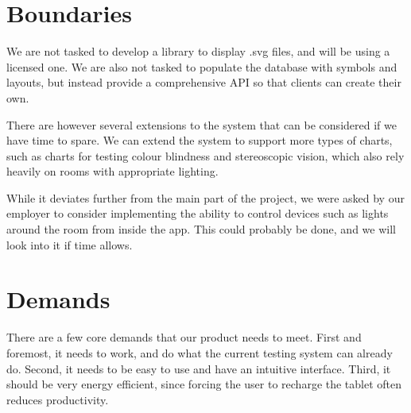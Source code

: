 \documentclass[12pt,a4paper,notitlepage]{report}
\begin{document}



\section{Boundaries}
We are not tasked to develop a library to display .svg files, and will be using a licensed one. We are also not tasked to populate the database with symbols and layouts, but instead provide a comprehensive API so that clients can create their own.


There are however several extensions to the system that can be considered if we have time to spare. We can extend the system to support more types of charts, such as charts for testing colour blindness and stereoscopic vision, which also rely heavily on rooms with appropriate lighting.

While it deviates further from the main part of the project, we were asked by our employer to consider implementing the ability to control devices such as lights around the room from inside the app. This could probably be done, and we will look into it if time allows.

\section{Demands} %
There are a few core demands that our product needs to meet. First and foremost, it needs to work, and do what the current testing system can already do. Second, it needs to be easy to use and have an intuitive interface. Third, it should be very energy efficient, since forcing the user to recharge the tablet often reduces productivity. 
\end{document}
